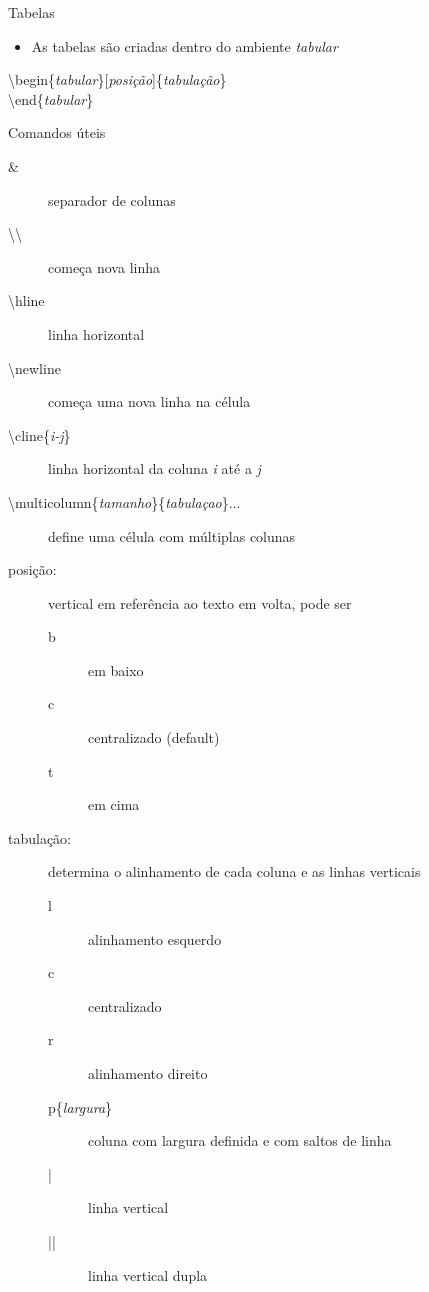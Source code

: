 \begin{frame}[allowframebreaks]{Tabelas}
    \begin{itemize}
    \item As tabelas são criadas dentro do ambiente \textit{tabular}
    \end{itemize}

    \alert{\textbackslash begin\{\textit{tabular}\}[\textit{posição}]\{\textit{tabulação}\} \\
           \textbackslash end\{\textit{tabular}\}
          }

    \begin{block}{Comandos úteis}
        \begin{description}
        \item[\&] separador de colunas
        \item[\textbackslash\textbackslash] começa nova linha
        \item[\textbackslash hline] linha horizontal
        \item[\textbackslash newline] começa uma nova linha na célula
        \item[\textbackslash cline\{\textit{i-j}\}] linha horizontal da coluna \textit{i} até a \textit{j}
        \item[\textbackslash multicolumn\{\textit{tamanho}\}\{\textit{tabulaçao}\}{...}] define uma célula com múltiplas colunas
        \end{description}
    \end{block}

    \newpage
    
    \begin{description}
    \item[posição:] vertical em referência ao texto em volta, pode ser
        \begin{description}
        \item[b] em baixo
        \item[c] centralizado (default)
        \item[t] em cima
        \end{description}
    \item[tabulação:] determina o alinhamento de cada coluna e as linhas verticais
        \begin{description}
        \item[l] alinhamento esquerdo
        \item[c] centralizado
        \item[r] alinhamento direito
        \item[p\{\textit{largura}\}] coluna com largura definida e com saltos de linha
        \item[|] linha vertical
        \item[||] linha vertical dupla
        \end{description}
    \end{description}
\end{frame}

